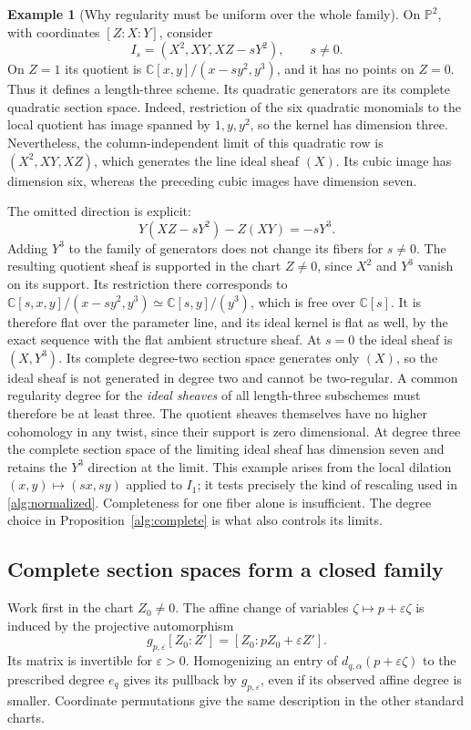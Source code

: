 \documentclass[11pt,reqno]{amsart}
\numberwithin{equation}{section}
\theoremstyle{definition}
\newtheorem{example}[theorem]{Example}
\theoremstyle{remark}
\begin{document}
\begin{example}[Why regularity must be uniform over the whole family]
\label{alg:degeneration-test}
On \(\mathbb P^2\), with coordinates \([Z:X:Y]\), consider
\[
 I_s=(X^2,XY,XZ-sY^2),\qquad s\ne0.
\]
On \(Z=1\) its quotient is
\(\mathbb C[x,y]/(x-sy^2,y^3)\), and it has no points on \(Z=0\).
Thus it defines a length-three scheme. Its quadratic generators are
its complete quadratic section space. Indeed, restriction of the six
quadratic monomials to the local quotient has image spanned by
\(1,y,y^2\), so the kernel has dimension three.
Nevertheless, the column-independent limit of this quadratic row is
\((X^2,XY,XZ)\), which generates the line ideal sheaf \((X)\).
Its cubic image has dimension six, whereas the preceding cubic images
have dimension seven.

The omitted direction is explicit:
\[
 Y(XZ-sY^2)-Z(XY)=-sY^3.
\]
Adding \(Y^3\) to the family of generators does not change its fibers
for $s\ne0$. The resulting quotient sheaf is supported in the chart
$Z\ne0$, since $X^2$ and $Y^3$ vanish on its support. Its restriction
there corresponds to
$\mathbb C[s,x,y]/(x-sy^2,y^3)\simeq\mathbb C[s,y]/(y^3)$,
which is free over $\mathbb C[s]$. It is therefore flat over the
parameter line, and its ideal kernel is flat as well, by the exact
sequence with the flat ambient structure sheaf. At $s=0$ the ideal
sheaf is $(X,Y^3)$. Its complete degree-two section space generates
only $(X)$, so the ideal sheaf is not generated in degree two and
cannot be two-regular. A common regularity degree for the \emph{ideal
sheaves} of all length-three subschemes must therefore be at least
three. The quotient sheaves themselves have no higher cohomology in
any twist, since their support is zero dimensional. At degree three the complete section
space of the limiting ideal sheaf has dimension seven and retains the \(Y^3\) direction at the
limit. This example arises from the local dilation
\((x,y)\mapsto(sx,sy)\) applied to \(I_1\); it tests precisely the
kind of rescaling used in \eqref{alg:normalized}. Completeness for
one fiber alone is insufficient. The degree choice in
Proposition~\ref{alg:complete} is what also controls its limits.
\end{example}

\subsection{Complete section spaces form a closed family}

Work first in the chart \(Z_0\neq0\). The affine change of variables
\(\zeta\mapsto p+\varepsilon\zeta\) is induced by the projective
automorphism
\begin{equation}
 g_{p,\varepsilon}[Z_0:Z']
 =
 [Z_0:pZ_0+\varepsilon Z'].
 \label{alg:projective-change}
\end{equation}
Its matrix is invertible for \(\varepsilon>0\). Homogenizing an entry
of \(d_{q,\alpha}(p+\varepsilon\zeta)\) to the prescribed degree
\(e_q\) gives its pullback by \(g_{p,\varepsilon}\), even if its
observed affine degree is smaller. Coordinate permutations give the
same description in the other standard charts.
\end{document}

